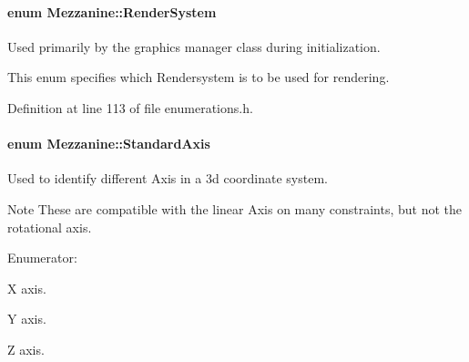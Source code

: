 \hypertarget{namespaceMezzanine_a1bb0347c37954bc71c4344e4b55c729a}{
\paragraph[{RenderSystem}]{\setlength{\rightskip}{0pt plus 5cm}enum {\bf Mezzanine::RenderSystem}}\hfill}
\label{namespaceMezzanine_a1bb0347c37954bc71c4344e4b55c729a}


Used primarily by the graphics manager class during initialization. 

This enum specifies which Rendersystem is to be used for rendering. 

Definition at line 113 of file enumerations.h.

\hypertarget{namespaceMezzanine_ab41a00a8c6a47b576dc987ec34e16ba1}{
\paragraph[{StandardAxis}]{\setlength{\rightskip}{0pt plus 5cm}enum {\bf Mezzanine::StandardAxis}}\hfill}
\label{namespaceMezzanine_ab41a00a8c6a47b576dc987ec34e16ba1}


Used to identify different Axis in a 3d coordinate system. 

\begin{DoxyNote}{Note}
These are compatible with the linear Axis on many constraints, but not the rotational axis. 
\end{DoxyNote}
\begin{Desc}
\item[Enumerator: ]\par
\begin{description}
\item[{\em 
\hypertarget{namespaceMezzanine_ab41a00a8c6a47b576dc987ec34e16ba1a823c8f182393aef96f017c7279d49126}{
Axis\_\-X}
\label{namespaceMezzanine_ab41a00a8c6a47b576dc987ec34e16ba1a823c8f182393aef96f017c7279d49126}
}]X axis. \item[{\em 
\hypertarget{namespaceMezzanine_ab41a00a8c6a47b576dc987ec34e16ba1a935c7afe0104697553cf85e9214fb3fb}{
Axis\_\-Y}
\label{namespaceMezzanine_ab41a00a8c6a47b576dc987ec34e16ba1a935c7afe0104697553cf85e9214fb3fb}
}]Y axis. \item[{\em 
\hypertarget{namespaceMezzanine_ab41a00a8c6a47b576dc987ec34e16ba1a6af6621383cc7da1fe11a86ba6de37c0}{
Axis\_\-Z}
\label{namespaceMezzanine_ab41a00a8c6a47b576dc987ec34e16ba1a6af6621383cc7da1fe11a86ba6de37c0}
}]Z axis. \end{description}
\end{Desc}



